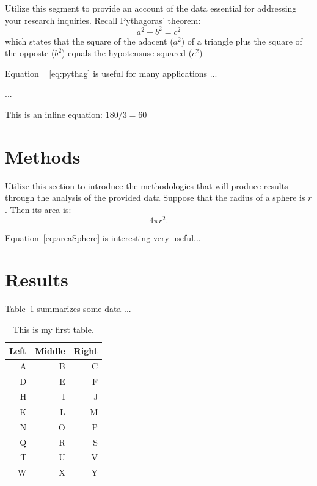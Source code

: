 \documentclass[12pt]{article}
\begin{document}
Utilize this segment to provide an account of the data essential for addressing
your research inquiries. Recall Pythagoras' theorem:
\begin{equation}
  \label{eq:pythag}
  a^2 + b^2 = c^2
\end{equation}
which states that the square of the adacent ($a^2$) of a triangle plus the square
of the opposte ($b^2$) equals the hypotensuse squared ($c^2$)

Equation ~ \eqref{eq:pythag} is useful for many applications ...

...


This is an inline equation: $ 180 / 3 = 60$ 
\section{Methods}
\label{sec:meth}


Utilize this section to introduce the methodologies that will produce results 
through the analysis of the provided data Suppose that the radius of a sphere 
is $r$. 
Then its area is:
\begin{equation}
  \label{eq:areaSphere}
  4\pi r^2.
\end{equation}

Equation~\eqref{eq:areaSphere} is interesting very useful... 



\section{Results}
\label{sec:resu}

Table~\ref{tab:rv} summarizes some data ...
\lipsum[1-4]

\begin{table}[tbp]
  \caption{This is my first table.}
  \label{tab:rv}
\centering
\begin{tabular}{rrr}
  \toprule
Left & Middle & Right \\ 
  \midrule
  A & B & C \\ 
  D & E & F \\ 
  H & I & J \\ 
  K & L & M \\ 
  N & O & P \\ 
  Q & R & S \\ 
  T & U & V \\ 
  W & X & Y \\ 
   \bottomrule
\end{tabular}
\end{table}
\end{document}
